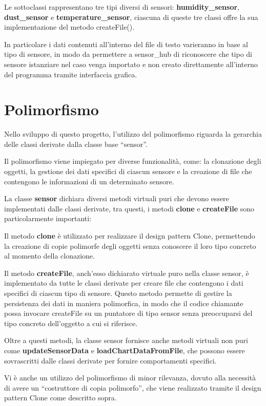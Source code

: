 \documentclass{article}
\begin{document}
Le sottoclassi rappresentano tre tipi diversi di sensori: \textbf{humidity\_sensor}, \textbf{dust\_sensor} e \textbf{temperature\_sensor},  ciascuna di queste tre classi offre la sua implementazione del metodo createFile().

\noindent In particolare i dati contenuti all’interno del file di testo varieranno in base al tipo di sensore, in modo da permettere a sensor\_hub di riconoscere che tipo di sensore istanziare nel caso venga importato e non creato direttamente all’interno del programma tramite interfaccia grafica. 

\section{Polimorfismo}
Nello sviluppo di questo progetto, l'utilizzo del polimorfismo riguarda la gerarchia delle classi derivate dalla classe base “sensor”.   


Il polimorfismo viene impiegato per diverse funzionalità, come: la clonazione degli oggetti, la gestione dei dati specifici di ciascun sensore e la creazione di file che contengono le informazioni di un determinato sensore.

\noindent La classe \textbf{sensor} dichiara diversi metodi virtuali puri che devono essere implementati dalle classi derivate,  tra questi, i metodi \textbf{clone} e \textbf{createFile} sono particolarmente importanti:

\noindent Il metodo \textbf{clone} è utilizzato per realizzare il design pattern Clone, permettendo la creazione di copie polimorfe degli oggetti senza conoscere il loro tipo concreto al momento della clonazione. 

\noindent Il metodo \textbf{createFile}, anch'esso dichiarato virtuale puro nella classe sensor, è implementato da tutte le classi derivate per creare file che contengono i dati specifici di ciascun tipo di sensore.   Questo metodo permette di gestire la persistenza dei dati in maniera polimorfica, in modo che il codice chiamante possa invocare createFile su un puntatore di tipo sensor senza preoccuparsi del tipo concreto dell'oggetto a cui si riferisce.


\noindent Oltre a questi metodi, la classe sensor fornisce anche metodi virtuali non puri come \textbf{updateSensorData} e \textbf{loadChartDataFromFile}, che possono essere sovrascritti dalle classi derivate per fornire comportamenti specifici.


\noindent Vi è anche un utilizzo del polimorfismo di minor rilevanza, dovuto alla necessità di avere un “costruttore di copia polimorfo”, che viene realizzato tramite il design pattern Clone come descritto sopra.  
\end{document}
